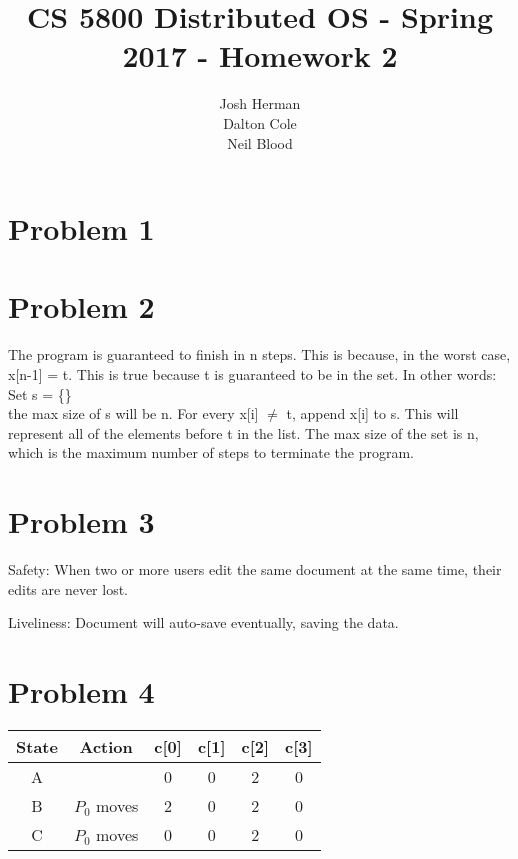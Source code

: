 \documentclass[times]{article}
\begin{document}
	\title{CS 5800 Distributed OS - Spring 2017 - Homework 2}
	\author{Josh Herman \\ Dalton Cole \\ Neil Blood}
	\date{}
	\maketitle

	\section{Problem 1}

	\section{Problem 2}

	The program is guaranteed to finish in n steps. This is because, in the worst case, x[n-1] = t. This is true because t is guaranteed to be in the set. In other words: \\
	Set s = \{\} \\
	the max size of s will be n. For every x[i] $\not=$ t, append x[i] to s. This will represent all of the elements before t in the list. The max size of the set is n, which is the maximum number of steps to terminate the program.

	\section{Problem 3}

	Safety: When two or more users edit the same document at the same time, their edits are never lost.

	Liveliness: Document will auto-save eventually, saving the data.

	\section{Problem 4}

	\begin{center}
		\begin{tabular}{ |c|c|c|c|c|c| } 
			 \hline
			 State 	& Action 		& c[0] 	& c[1] 	& c[2] 	& c[3] \\ 
			 \hline
			 A 		& 				& 0		& 0 	& 2 	& 0 	\\ 
			 B 		& $P_0$ moves	& 2		& 0 	& 2 	& 0 	\\ 
			 C 		& $P_0$ moves	& 0		& 0 	& 2 	& 0 	\\ 
			 \hline
		\end{tabular}
	\end{center}
\end{document}
